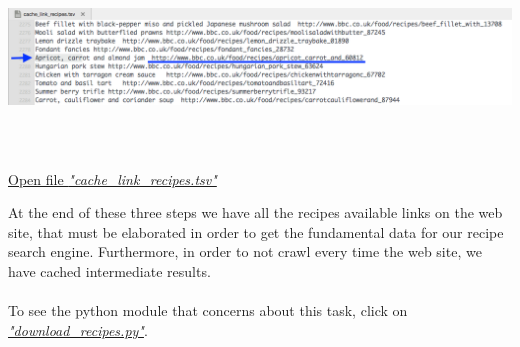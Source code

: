 \documentclass[oneside]{article}			%
\begin{document}
\begin{enumerate}[label=\arabic*.]
		\includegraphics[width=15cm, height=5cm]{./report_file/img/cache_link_recipes.png}
		\begin{flushright}\href{run:./report_file/cache_link_recipes.tsv}{Open file \textit{"cache\_link\_recipes.tsv"}}\end{flushright}
	\end{enumerate}
	At the end of these three steps we have all the recipes available links on the web site, that must be elaborated in order to get the fundamental data for our recipe search engine. Furthermore, in order to not crawl every time the web site, we have cached intermediate results.
	\\\\
	To see the python module that concerns about this task, click on \href{run:./report_file/src/download_recipes.py}{\textit{"download\_recipes.py"}}.

\end{document}
